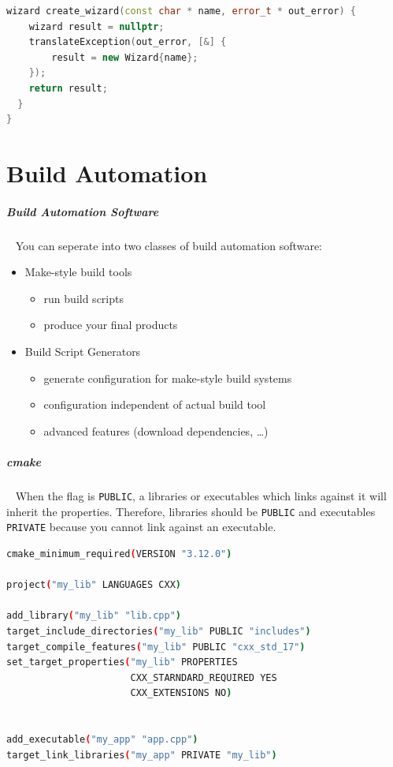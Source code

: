 \documentclass[11pt,twoside,landscape]{article}
\begin{document}
\begin{multicols}{2}
\begin{lstlisting}[language=c++,numbers=none]
  wizard create_wizard(const char * name, error_t * out_error) {
    wizard result = nullptr;
    translateException(out_error, [&] {
        result = new Wizard{name};
    });
    return result;
  }
}
\end{lstlisting}

\section{Build Automation}
\label{sec:orga79d9f5}
\subparagraph{Build Automation Software} \
\label{sec:org91a2f04}
You can seperate into two classes of build automation software:
\begin{itemize}
\item Make-style build tools
\begin{itemize}
\item run build scripts
\item produce your final products
\end{itemize}
\item Build Script Generators
\begin{itemize}
\item generate configuration for make-style build systems
\item configuration independent of actual build tool
\item advanced features (download dependencies, \ldots{})
\end{itemize}
\end{itemize}


\subparagraph{cmake} \
\label{sec:org7a2739e}
When the flag is \texttt{PUBLIC}, a libraries or executables which links against it will inherit the properties.
Therefore, libraries should be \texttt{PUBLIC} and executables \texttt{PRIVATE} because you cannot link against an executable.


\begin{lstlisting}[language=sh,label=lst:example-for-cmakelists-txt,caption={Example for CMakeLists.txt},captionpos=b,numbers=none]
cmake_minimum_required(VERSION "3.12.0")

project("my_lib" LANGUAGES CXX)

add_library("my_lib" "lib.cpp")
target_include_directories("my_lib" PUBLIC "includes")
target_compile_features("my_lib" PUBLIC "cxx_std_17")
set_target_properties("my_lib" PROPERTIES
                      CXX_STARNDARD_REQUIRED YES
                      CXX_EXTENSIONS NO)


add_executable("my_app" "app.cpp")
target_link_libraries("my_app" PRIVATE "my_lib")
\end{lstlisting}


\end{multicols}
\end{document}

